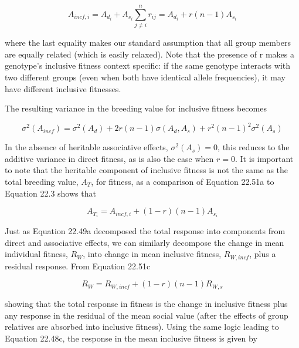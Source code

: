 \documentclass{article}
\begin{document}
\begin{equation}
A_{incf,i}=A_{d_{i}}+A_{s_{i}}\sum_{j\neq i}^{n}r_{ij}=A_{d_{i}}+r(n-1)A_{s_{i}}
\tag{22.51a}
\label{eq:22_51a}
\end{equation}

where the last equality makes our standard assumption that all group members are equally related (which is easily relaxed). Note that the presence of r makes a genotype's inclusive fitness context specific: if the same genotype interacts with two different groups (even when both have identical allele frequencies), it may have different inclusive fitnesses.

The resulting variance in the breeding value for inclusive fitness becomes

\begin{equation}
\sigma^{2}(A_{i n c f})=\sigma^{2}(A_{d})+2r(n-1)\sigma(A_{d},A_{s})+r^{2}(n-1)^{2}\sigma^{2}(A_{s})
\tag{22.51b}
\label{eq:22_51b}
\end{equation}

In the absence of heritable associative effects,  $ \sigma^2(A_s) = 0 $, this reduces to the additive variance in direct fitness, as is also the case when  $ r = 0 $. It is important to note that the heritable component of inclusive fitness is not the same as the total breeding value,  $ A_T $, for fitness, as a comparison of Equation 22.51a to Equation 22.3 shows that

\begin{equation}
A_{T_{i}}=A_{i n c f,i}+(1-r)(n-1)A_{s_{i}}
\tag{22.51c}
\label{eq:22_51c}
\end{equation}

Just as Equation 22.49a decomposed the total response into components from direct and associative effects, we can similarly decompose the change in mean individual fitness,  $ R_{W} $, into change in mean inclusive fitness,  $ R_{W,incf} $, plus a residual response. From Equation 22.51c

\begin{equation}
R_{W}=R_{W,incf}+(1-r)(n-1)R_{W,s}
\tag{22.52a}
\label{eq:22_52a}
\end{equation}

showing that the total response in fitness is the change in inclusive fitness plus any response in the residual of the mean social value (after the effects of group relatives are absorbed into inclusive fitness). Using the same logic leading to Equation 22.48c, the response in the mean inclusive fitness is given by
\end{document}
